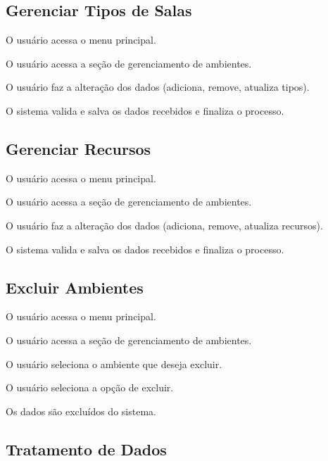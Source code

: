 \documentclass[12pt,a4paper]{article}
\begin{document}
\subsection{Gerenciar Tipos de Salas}

\begin{fluxo}
  \item O usuário acessa o menu principal.
  \item O usuário acessa a seção de gerenciamento de ambientes.
  \item O usuário faz a alteração dos dados (adiciona, remove, atualiza tipos).
  \item O sistema valida e salva os dados recebidos e finaliza o processo.
\end{fluxo}

\subsection{Gerenciar Recursos}

\begin{fluxo}
  \item O usuário acessa o menu principal.
  \item O usuário acessa a seção de gerenciamento de ambientes.
  \item O usuário faz a alteração dos dados (adiciona, remove, atualiza
        recursos).
  \item O sistema valida e salva os dados recebidos e finaliza o processo.
\end{fluxo}

\subsection{Excluir Ambientes}

\begin{fluxo}
  \item O usuário acessa o menu principal.
  \item O usuário acessa a seção de gerenciamento de ambientes.
  \item O usuário seleciona o ambiente que deseja excluir.
  \item O usuário seleciona a opção de excluir.
  \item Os dados são excluídos do sistema.
\end{fluxo}

\subsection{Tratamento de Dados}
\end{document}
